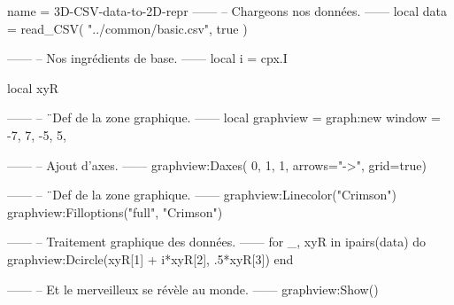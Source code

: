 \documentclass{standalone}
\begin{document}
\begin{luadraw}{name = 3D-CSV-data-to-2D-repr}
------
-- Chargeons nos données.
------
local data = read_CSV(
  "../common/basic.csv",
  true
)

------
-- Nos ingrédients de base.
------
local i = cpx.I

local xyR

------
-- ¨Def de la zone graphique.
------
local graphview = graph:new{
  window = {-7, 7, -5, 5},
}

------
-- Ajout d'axes.
------
graphview:Daxes(
  {0, 1, 1},
  {arrows="->",
  grid=true})

------
-- ¨Def de la zone graphique.
------
graphview:Linecolor("Crimson")
graphview:Filloptions("full", "Crimson")

------
-- Traitement graphique des données.
------
for _, xyR in ipairs(data) do
  graphview:Dcircle(xyR[1] + i*xyR[2], .5*xyR[3])
end

------
-- Et le merveilleux se révèle au monde.
------
graphview:Show()
\end{luadraw}
\end{document}
